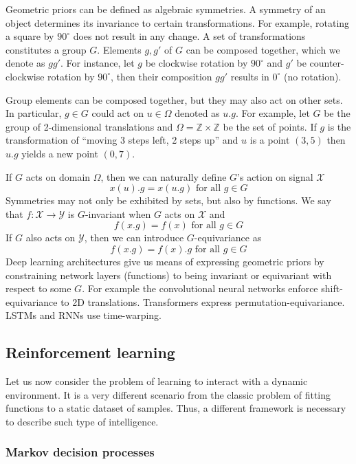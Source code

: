 \documentclass[12pt]{article}
\begin{document}
Geometric priors can be defined as algebraic symmetries. A symmetry of an object determines its invariance to certain transformations. For example, rotating a square by $90^\circ$ does not result in any change. A set of transformations constitutes a group $G$. Elements $g,g'$ of $G$ can be composed together, which we denote as $gg'$. For instance, let $g$ be clockwise rotation by $90^\circ$ and $g'$ be counter-clockwise rotation by $90^\circ$, then their composition $gg'$ results in $0^\circ$ (no rotation). 

Group elements can be composed together, but they may also act on other sets. In particular, $g\in G$ could act on $u\in \Omega$ denoted as $u.g$. For example, let $G$ be the group of 2-dimensional translations and $\Omega=\mathbb{Z} \times \mathbb{Z}$ be the set of points. If $g$ is the transformation of ``moving 3 steps left, 2 steps up'' and $u$ is a point $(3,5)$ then $u.g$ yields a new point $(0,7)$.

If $G$ acts on domain $\Omega$, then we can naturally define $G$'s action on signal $\mathcal{X}$
\[
x(u).g = x(u.g)\text{ for all }g\in G
\]
Symmetries may not only be exhibited by sets, but also by functions. We say that $f:\mathcal{X}\rightarrow\mathcal{Y}$ is $G$-invariant when $G$ acts on $\mathcal{X}$ and 
\[
f(x.g) = f(x)\text{ for all }g\in G
\]
If $G$ also acts on $\mathcal{Y}$, then we can introduce  $G$-equivariance as
\[
f(x.g) = f(x).g \text{ for all }g\in G
\]  
Deep learning architectures give us means of expressing geometric priors by constraining network layers (functions) to being invariant or equivariant with respect to some $G$. For example the convolutional neural networks enforce shift-equivariance to 2D translations. Transformers express permutation-equivariance. LSTMs and RNNs use time-warping.


\subsection{Reinforcement learning}

Let us now consider  the problem of learning to interact with a dynamic environment. It is a very different scenario from the classic problem of fitting functions to a static dataset of samples. Thus, a different framework is necessary to describe such type of intelligence.

\subsubsection{Markov decision processes}
\end{document}
